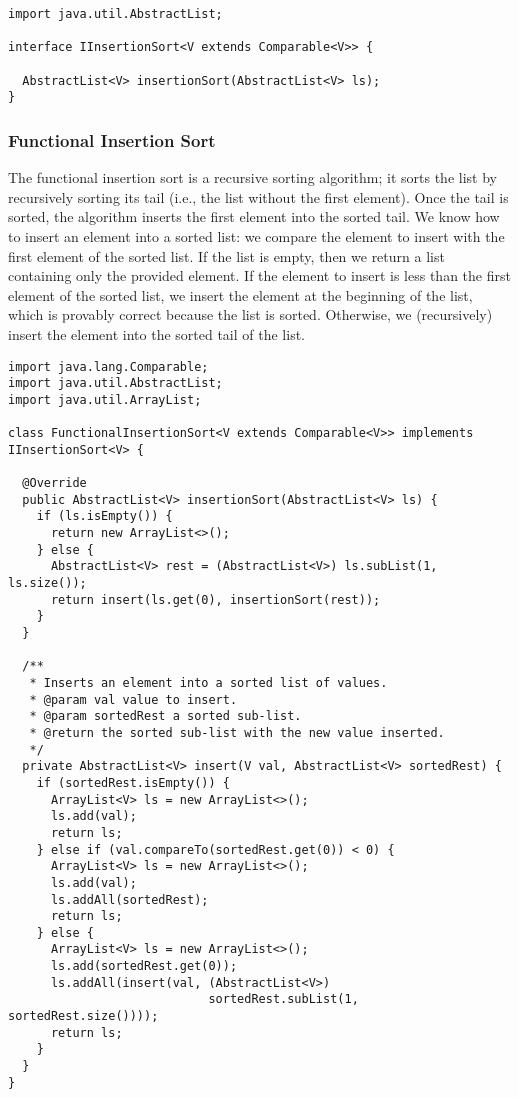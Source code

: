 \begin{lstlisting}[language=MyJava]
import java.util.AbstractList;

interface IInsertionSort<V extends Comparable<V>> {

  AbstractList<V> insertionSort(AbstractList<V> ls);
}
\end{lstlisting}

\newpage
\subsubsection*{Functional Insertion Sort}

The functional insertion sort is a recursive sorting algorithm; it sorts the list by recursively sorting its tail (i.e., the list without the first element). Once the tail is sorted, the algorithm inserts the first element into the sorted tail.
We know how to insert an element into a sorted list: we compare the element to insert with the first element of the sorted list. 
If the list is empty, then we return a list containing only the provided element.
If the element to insert is less than the first element of the sorted list, we insert the element at the beginning of the list, which is provably correct because the list is sorted. 
Otherwise, we (recursively) insert the element into the sorted tail of the list.

\begin{lstlisting}[language=MyJava]
import java.lang.Comparable;
import java.util.AbstractList;
import java.util.ArrayList;

class FunctionalInsertionSort<V extends Comparable<V>> implements IInsertionSort<V> {
  
  @Override
  public AbstractList<V> insertionSort(AbstractList<V> ls) {
    if (ls.isEmpty()) { 
      return new ArrayList<>(); 
    } else { 
      AbstractList<V> rest = (AbstractList<V>) ls.subList(1, ls.size());
      return insert(ls.get(0), insertionSort(rest)); 
    }
  }

  /**
   * Inserts an element into a sorted list of values.
   * @param val value to insert.
   * @param sortedRest a sorted sub-list.
   * @return the sorted sub-list with the new value inserted.
   */
  private AbstractList<V> insert(V val, AbstractList<V> sortedRest) {
    if (sortedRest.isEmpty()) {
      ArrayList<V> ls = new ArrayList<>();
      ls.add(val);
      return ls;
    } else if (val.compareTo(sortedRest.get(0)) < 0) {
      ArrayList<V> ls = new ArrayList<>();
      ls.add(val);
      ls.addAll(sortedRest);
      return ls;
    } else {
      ArrayList<V> ls = new ArrayList<>();
      ls.add(sortedRest.get(0));
      ls.addAll(insert(val, (AbstractList<V>) 
                            sortedRest.subList(1, sortedRest.size())));
      return ls;
    }
  }
}
\end{lstlisting}

